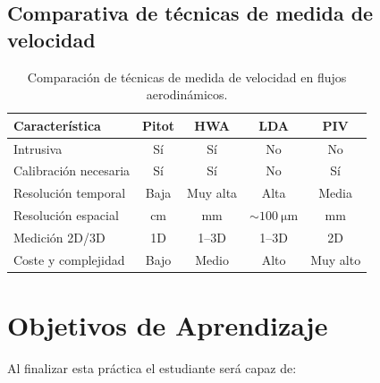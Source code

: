 \documentclass[12pt,a4paper]{article}
\begin{document}
\subsection{Comparativa de técnicas de medida de velocidad}

\begin{table}[H]
	\centering
	\caption{Comparación de técnicas de medida de velocidad en flujos
		aerodinámicos.}
	\label{tab:comparativa}
	\begin{tabular}{l c c c c}
		\toprule
		\textbf{Característica} & \textbf{Pitot} & \textbf{HWA}
		                        & \textbf{LDA}   & \textbf{PIV}                                       \\
		\midrule
		Intrusiva               & Sí             & Sí           & No                       & No       \\
		Calibración necesaria   & Sí             & Sí           & No                       & Sí       \\
		Resolución temporal     & Baja           & Muy alta     & Alta                     & Media    \\
		Resolución espacial     & cm             & mm           & $\sim\SI{100}{\micro\m}$
		                        & mm                                                                  \\
		Medición 2D/3D          & 1D             & 1--3D        & 1--3D                    & 2D       \\
		Coste y complejidad     & Bajo           & Medio        & Alto                     & Muy alto \\
		\bottomrule
	\end{tabular}
\end{table}

\section{Objetivos de Aprendizaje}
\label{sec:objetivos}

Al finalizar esta práctica el estudiante será capaz de:
\end{document}
